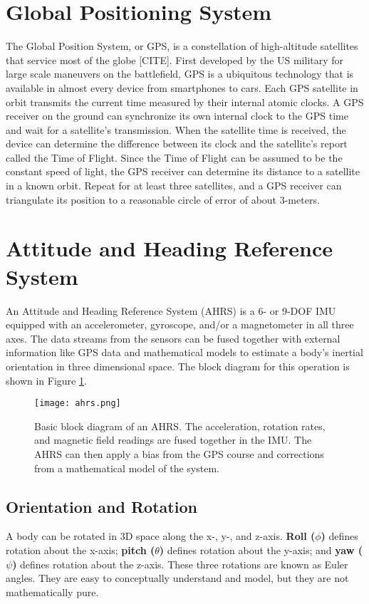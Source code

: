 \section{Global Positioning System} \label{sec:bkg_gps}
The Global Position System, or GPS, is a constellation of high-altitude satellites that service most of the globe [CITE].
First developed by the US military for large scale maneuvers on the battlefield, GPS is a ubiquitous technology that is available in almost every device from smartphones to cars.
Each GPS satellite in orbit transmits the current time measured by their internal atomic clocks.
A GPS receiver on the ground can synchronize its own internal clock to the GPS time and wait for a satellite's transmission.
When the satellite time is received, the device can determine the difference between its clock and the satellite's report called the Time of Flight.
Since the Time of Flight can be assumed to be the constant speed of light, the GPS receiver can determine its distance to a satellite in a known orbit.
Repeat for at least three satellites, and a GPS receiver can triangulate its position to a reasonable circle of error of about 3-meters.

\section{Attitude and Heading Reference System} \label{sec:bkg_ahrs}
An Attitude and Heading Reference System (AHRS) is a 6- or 9-DOF IMU equipped with an accelerometer, gyroscope, and/or a magnetometer in all three axes.
The data streams from the sensors can be fused together with external information like GPS data and mathematical models to estimate a body's inertial orientation in three dimensional space.
The block diagram for this operation is shown in Figure \ref{fig:ahrs_design}.

\begin{figure}[h!]
    \caption[AHRS block diagram]{Basic block diagram of an AHRS. 
    The acceleration, rotation rates, and magnetic field readings are fused together in the IMU. 
    The AHRS can then apply a bias from the GPS course and corrections from a mathematical model of the system.}
    \label{fig:ahrs_design}
    \centering
    \texttt{[image: ahrs.png]}
\end{figure}

\subsection{Orientation and Rotation} \label{ssec:bkg_orientation}
A body can be rotated in 3D space along the x-, y-, and z-axis.
\textbf{Roll ($\phi$)} defines rotation about the x-axis; \textbf{pitch ($\theta$)} defines rotation about the y-axis; and \textbf{yaw ($\psi$)} defines rotation about the z-axis.
These three rotations are known as Euler angles.
They are easy to conceptually understand and model, but they are not mathematically pure.

